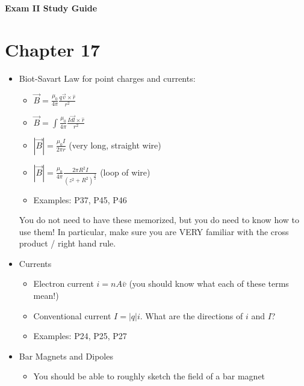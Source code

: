 \documentclass{article}
\begin{document}
\fancyfoot[C]{\thepage}
\vspace*{0cm}
\begin{center}
	{\LARGE \textbf{Exam II Study Guide}}\\
	\vspace{0.25cm}
\end{center}
\section*{Chapter 17}
\begin{itemize}
	\item Biot-Savart Law for point charges and currents:
	\begin{itemize}
		\item $\vec{B}=\frac{\mu_0}{4\pi}\frac{q\vec{v}\times \hat{r}}{r^2}$
		\item $\vec{B}=\int\frac{\mu_0}{4\pi}\frac{I\vec{dl}\times\hat{r}}{r^2}$
		\item $|\vec{B}|=\frac{\mu_0 I }{2\pi r}$ (very long, straight wire)
		\item $|\vec{B}|=\frac{\mu_0}{4\pi}\frac{2\pi R^2I}{\left(z^2+R^2\right)^\frac{3}{2}}$ (loop of wire)
		\item Examples: P37, P45, P46
	\end{itemize}
	You do not need to have these memorized, but you do need to know how to use them! In particular, make sure you are VERY familiar with the cross product / right hand rule.
	\item Currents
	\begin{itemize}
		\item Electron current $i=nA\bar{v}$ (you should know what each of these terms mean!)
		\item Conventional current $I=|q|i$. What are the directions of $i$ and $I$?
		\item Examples: P24, P25, P27
	\end{itemize}

	\item Bar Magnets and Dipoles
	\begin{itemize}
		\item You should be able to roughly sketch the field of a bar magnet
	\end{itemize}
\end{itemize}
\end{document}
